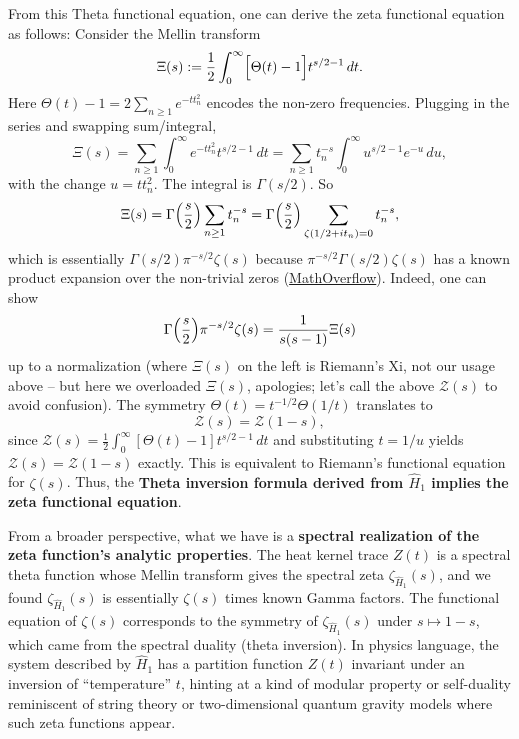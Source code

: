 \documentclass[12pt]{article}
\theoremstyle{plain}
\theoremstyle{definition}
\begin{document}
From this Theta functional equation, one can derive the zeta functional equation as follows:
Consider the Mellin transform
\[
\Xi(s) := \frac{1}{2}\int_0^\infty \Bigl[\Theta(t) - 1\Bigr] t^{s/2 - 1}\,dt.
\]
Here \(\Theta(t) - 1 = 2\sum_{n\ge1} e^{-t t_n^2}\) encodes the non-zero frequencies. Plugging in the series and swapping sum/integral,
\[
\Xi(s) = \sum_{n\ge1} \int_0^\infty e^{-t t_n^2} t^{s/2 - 1}\,dt = \sum_{n\ge1} t_n^{-s} \int_0^\infty u^{s/2 - 1} e^{-u}\,du,
\]
with the change \(u = t t_n^2\). The integral is \(\Gamma(s/2)\). So
\[
\Xi(s) = \Gamma\Bigl(\frac{s}{2}\Bigr) \sum_{n\ge1} t_n^{-s} = \Gamma\Bigl(\frac{s}{2}\Bigr) \sum_{\zeta(1/2 + it_n)=0} t_n^{-s},
\]
which is essentially \(\Gamma(s/2)\pi^{-s/2}\zeta(s)\) because \(\pi^{-s/2}\Gamma(s/2)\zeta(s)\) has a known product expansion over the non-trivial zeros (\href{https://mathoverflow.net/questions/120067/what-do-theta-functions-have-to-do-with-quadratic-reciprocity#:~:text=arithmetic%20significance}{MathOverflow}). Indeed, one can show 
\[
\Gamma\Bigl(\frac{s}{2}\Bigr)\pi^{-s/2}\zeta(s) = \frac{1}{s(s-1)}\Xi(s)
\]
up to a normalization (where \(\Xi(s)\) on the left is Riemann's Xi, not our usage above -- but here we overloaded \(\Xi(s)\), apologies; let's call the above \(\mathcal{Z}(s)\) to avoid confusion). The symmetry \(\Theta(t) = t^{-1/2}\Theta(1/t)\) translates to 
\[
\mathcal{Z}(s) = \mathcal{Z}(1-s),
\]
since
\(\mathcal{Z}(s) = \frac{1}{2}\int_0^\infty [\Theta(t)-1] t^{s/2-1}\,dt\) and substituting \(t=1/u\) yields \(\mathcal{Z}(s) = \mathcal{Z}(1-s)\) exactly. This is equivalent to Riemann's functional equation for \(\zeta(s)\). Thus, the \textbf{Theta inversion formula derived from \(\hat{H}_1\) implies the zeta functional equation}.

From a broader perspective, what we have is a \textbf{spectral realization of the zeta function's analytic properties}. The heat kernel trace \(Z(t)\) is a spectral theta function whose Mellin transform gives the spectral zeta \(\zeta_{\hat{H}_1}(s)\), and we found \(\zeta_{\hat{H}_1}(s)\) is essentially \(\zeta(s)\) times known Gamma factors. The functional equation of \(\zeta(s)\) corresponds to the symmetry of \(\zeta_{\hat{H}_1}(s)\) under \(s\mapsto 1-s\), which came from the spectral duality (theta inversion). In physics language, the system described by \(\hat{H}_1\) has a partition function \(Z(t)\) invariant under an inversion of ``temperature'' \(t\), hinting at a kind of modular property or self-duality reminiscent of string theory or two-dimensional quantum gravity models where such zeta functions appear.
\end{document}
